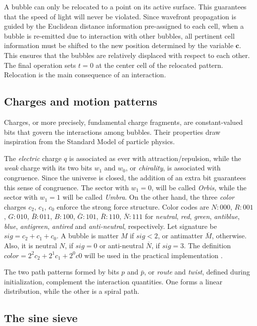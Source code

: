 \documentclass[12pt,english]{article}
\begin{document}
A bubble can only be relocated to a point on its active surface. This guarantees that the speed of light will never be violated. Since wavefront propagation is guided by the Euclidean distance information pre-assigned to each cell, when a bubble is re-emitted due to interaction with other bubbles, all pertinent cell information must be shifted to the new position determined by the variable $\textbf{c}$. This ensures that the bubbles are relatively displaced with respect to each other. The final operation sets $t=0$ at the center cell of the relocated pattern. Relocation is the main consequence of an interaction.

\subsection{Charges and motion patterns}
Charges, or more precisely, fundamental charge fragments, are constant-valued bits that govern the interactions among bubbles. Their properties draw inspiration from the Standard Model of particle physics.

The \emph{electric} charge $q$ is associated as ever with attraction/repulsion, while the \emph{weak} charge with its two bits $w_{1}$ and $w_{0}$, or \emph{chirality}, is associated with congruence. Since the universe is closed, the addition of an extra bit guarantees this sense of congruence. The sector with $w_{1}=0$, will be called \emph{Orbis, }while the sector with $w_{1}=1$ will be called \emph{Umbra}. On the other hand, the three \emph{color} charges $c_{2}$, $c_{1}$, $c_{0}$ enforce the strong force structure. Color codes are $N:000$, $R:001$, $G:010$, $\bar{B}:011$, $B:100$, $\bar{G}:101$, $\bar{R}:110$, $\bar{N}:111$ for \emph{neutral}, \emph{red}, \emph{green}, \emph{antiblue}, \emph{blue}, \emph{antigreen}, \emph{antired} and \emph{anti-neutral}, respectively. Let signature be $sig=c_{2}+c_{1}+c_{0}$. A bubble is matter $M$ if $sig<2$, or antimatter $\overline{M}$, otherwise. Also, it is neutral $N$, if $sig=0$ or anti-neutral $\overline{N}$, if $sig=3$. The definition $color=2^{2}c_{2}+2^{1}c_{1}+2^{0}c0$ will be used in the practical implementation \cite{af_neto}.

The two path patterns formed by bits $p$ and $\bar{p}$, or \emph{route} and \emph{twist}, defined during initialization,  complement the interaction quantities. One forms a linear distribution, while the other is a spiral path.

\subsection{The sine sieve}\label{subsec:Sine}
\end{document}

